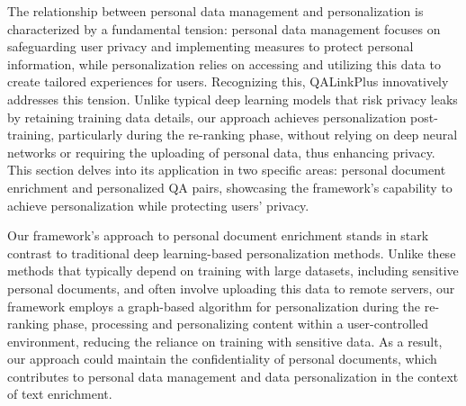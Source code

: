 \documentclass[11pt]{article}
\begin{document}
The relationship between personal data management and personalization is characterized by a fundamental tension: personal data management focuses on safeguarding user privacy and implementing measures to protect personal information, while personalization relies on accessing and utilizing this data to create tailored experiences for users. Recognizing this, QALinkPlus innovatively addresses this tension. Unlike typical deep learning models that risk privacy leaks by retaining training data details, our approach achieves personalization post-training, particularly during the re-ranking phase, without relying on deep neural networks or requiring the uploading of personal data, thus enhancing privacy. This section delves into its application in two specific areas: personal document enrichment and personalized QA pairs, showcasing the framework's capability to achieve personalization while protecting users' privacy.


Our framework's approach to personal document enrichment stands in stark contrast to traditional deep learning-based personalization methods.  Unlike these methods that typically depend on training with large datasets, including sensitive personal documents, and often involve uploading this data to remote servers, our framework employs a graph-based algorithm for personalization during the re-ranking phase, processing and personalizing content within a user-controlled environment, reducing the reliance on training with sensitive data. As a result, our approach could maintain the confidentiality of personal documents, which contributes to personal data management and data personalization in the context of text enrichment.
\end{document}
